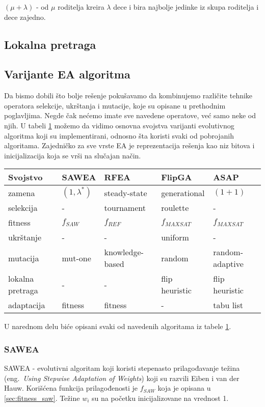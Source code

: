 \documentclass{article}
\begin{document}
$(\mu + \lambda)$ - od $\mu$ roditelja kreira $\lambda$ dece i bira najbolje jedinke iz skupa roditelja i dece zajedno.


\subsection{Lokalna pretraga}
 \label{sec:ea_lokalna_pretraga}

\subsection{Varijante EA algoritma}
\label{sec:ea_varijante}
Da bismo dobili što bolje rešenje pokušavamo da kombinujemo različite tehnike 
operatora selekcije, ukrštanja i mutacije, koje su opisane u prethodnim poglavljima. 
Negde čak nećemo imate sve navedene operatove, već samo neke od njih. 
U tabeli \ref{tab:EA} možemo da vidimo osnovna svojstva varijanti evolutivnog algoritma 
koji su implementirani, odnosno šta koristi svaki od pobrojanih algoritama.
Zajedničko za sve vrste EA je reprezentacija rešenja kao niz bitova i
inicijalizacija koja se vrši na slučajan način.
 
\begin{table}[h!]
\centering
{}\label{tab:EA} 
\begin{tabular}{ |p{2.8cm}|p{2.3cm}|p{2.3cm}|p{2.3cm}|p{2.3cm}|}
 \hline
 Svojstvo & SAWEA & RFEA & FlipGA & ASAP \\
 \hline
 zamena & $(1, \lambda^*)$ & steady-state & generational & $(1 + 1)$ \\
 \hline
 selekcija & - & tournament & roulette & - \\
 \hline
 fitness &	$f_{SAW}$ & $f_{REF}$ & $f_{MAXSAT}$ & $f_{MAXSAT}$ \\
 \hline
 ukrštanje & - & - & uniform & - \\
 \hline
 mutacija & mut-one & knowledge-based & random & random-adaptive \\
 \hline
 lokalna pretraga & - & - & flip heuristic & flip heuristic \\
 \hline
 adaptacija & fitness & fitness &  - & tabu list \\
 \hline
\end{tabular}
\end{table}

U narednom delu biće opisani svaki od navedenih algoritama iz tabele \ref{tab:EA}.

\subsubsection{SAWEA}
\label{sec:ea_sawea}
SAWEA - evolutivni algoritam koji koristi stepenasto prilagođavanje težina (eng.~{\em Using Stepwise Adaptation of Weights}) \cite{ea_with_table, ea_without_table} koji su razvili Eiben i van der Hauw. Korišćena funkcija prilagođenosti je $f_{SAW}$  koja je opisana u \ref{sec:fitness_saw}. Težine $w_i$  su na početku inicijalizovane na vrednost 1. \\
\end{document}
